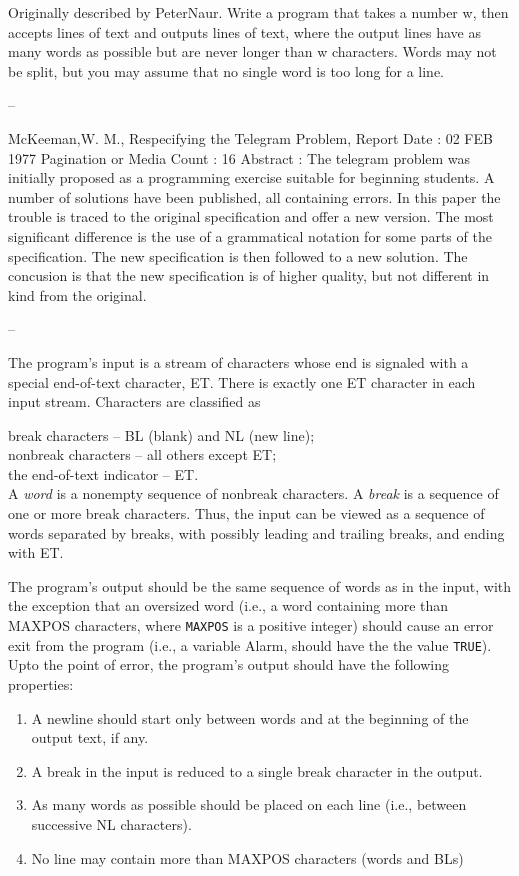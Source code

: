 
Originally described by PeterNaur.  Write a program that takes a number
w, then accepts lines of text and outputs lines of text, where the
output lines have as many words as possible but are never longer than w
characters. Words may not be split, but you may assume that no single
word is too long for a line.

--

McKeeman,W. M., Respecifying the Telegram Problem, Report Date : 02 FEB
1977 Pagination or Media Count : 16 Abstract : The telegram problem was
initially proposed as a programming exercise suitable for beginning
students. A number of solutions have been published, all containing
errors. In this paper the trouble is traced to the original
specification and offer a new version. The most significant difference
is the use of a grammatical notation for some parts of the
specification. The new specification is then followed to a new
solution. The concusion is that the new specification is of higher
quality, but not different in kind from the original.

--

The program's input is a stream of characters whose end is signaled
with a special end-of-text character, ET.  There is exactly one ET
character in each input stream.  Characters are classified as

break characters -- BL (blank) and NL (new line);\\
nonbreak characters -- all others except ET;\\
the end-of-text indicator -- ET.\\

A {\sl word} is a nonempty sequence of nonbreak characters.  A {\sl break}
is a sequence of one or more break characters.  Thus, the input can be
viewed as a sequence of words separated by breaks, with possibly
leading and trailing breaks, and ending with ET.

The program's output should be the same sequence of words as in the
input, with the exception that an oversized word (i.e., a word
containing more than MAXPOS characters, where {\tt MAXPOS} is a
positive integer) should cause an error exit from the program (i.e., a
variable Alarm, should have the the value {\tt TRUE}).  Upto the point
of error, the program's output should have the following properties:

\begin{enumerate}
\item
A newline should start only between words and at the beginning of the
output text, if any.

\item
A break in the input is reduced to a single break character in the
output.

\item
As many words as possible should be placed on each line (i.e., between
successive
NL characters).

\item
No line may contain more than MAXPOS characters (words and BLs)
\end{enumerate}
